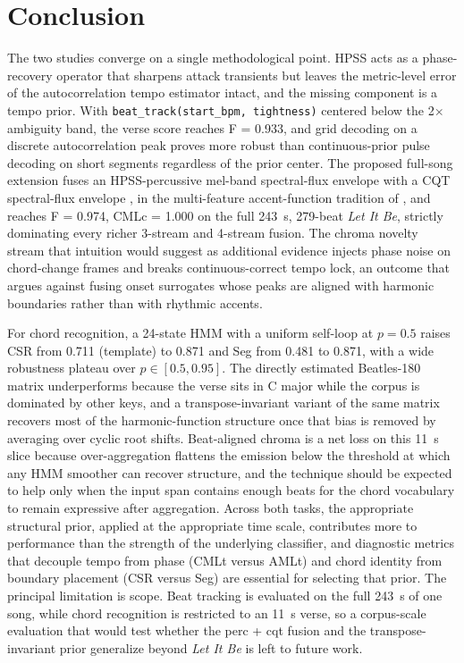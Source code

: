 \documentclass{article}
\begin{document}
\section*{Conclusion}
The two studies converge on a single methodological point. HPSS \cite{fitzgerald2010hpss} acts as a phase-recovery operator that sharpens attack transients but leaves the metric-level error of the autocorrelation tempo estimator intact, and the missing component is a tempo prior. With \texttt{beat\_track(start\_bpm, tightness)} \cite{ellis2007beat} centered below the 2$\times$ ambiguity band, the verse score reaches F = 0.933, and grid decoding on a discrete autocorrelation peak proves more robust than continuous-prior pulse decoding on short segments regardless of the prior center. The proposed full-song extension fuses an HPSS-percussive mel-band spectral-flux envelope with a CQT spectral-flux envelope \cite{bello2005onset,schorkhuber2010cqt}, in the multi-feature accent-function tradition of \cite{goto2001beat,klapuri2006meter}, and reaches F = 0.974, CMLc = 1.000 on the full 243~s, 279-beat \textit{Let It Be}, strictly dominating every richer 3-stream and 4-stream fusion. The chroma novelty stream that intuition would suggest as additional evidence injects phase noise on chord-change frames and breaks continuous-correct tempo lock, an outcome that argues against fusing onset surrogates whose peaks are aligned with harmonic boundaries rather than with rhythmic accents.

For chord recognition, a 24-state HMM with a uniform self-loop at $p = 0.5$ raises CSR from 0.711 (template) to 0.871 and Seg from 0.481 to 0.871, with a wide robustness plateau over $p \in [0.5, 0.95]$. The directly estimated Beatles-180 matrix \cite{mueller2015fmp} underperforms because the verse sits in C major while the corpus is dominated by other keys, and a transpose-invariant variant of the same matrix recovers most of the harmonic-function structure once that bias is removed by averaging over cyclic root shifts. Beat-aligned chroma is a net loss on this 11~s slice because over-aggregation flattens the emission below the threshold at which any HMM smoother can recover structure, and the technique should be expected to help only when the input span contains enough beats for the chord vocabulary to remain expressive after aggregation. Across both tasks, the appropriate structural prior, applied at the appropriate time scale, contributes more to performance than the strength of the underlying classifier, and diagnostic metrics that decouple tempo from phase (CMLt versus AMLt) and chord identity from boundary placement (CSR versus Seg) are essential for selecting that prior. The principal limitation is scope. Beat tracking is evaluated on the full 243~s of one song, while chord recognition is restricted to an 11~s verse, so a corpus-scale evaluation that would test whether the perc + cqt fusion and the transpose-invariant prior generalize beyond \textit{Let It Be} is left to future work.



\end{document}
